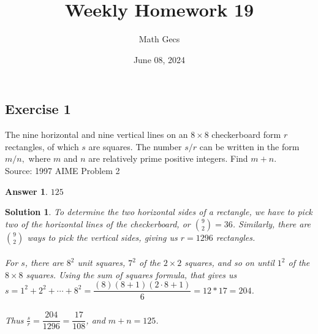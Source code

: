 \documentclass[12pt]{article}
\title{Weekly Homework 19}
\author{Math Gecs}
\date{June 08, 2024}
\newtheorem*{answer*}{Answer}
\newtheorem*{solution*}{Solution}
\begin{document}
\maketitle

\subsection*{Exercise 1}
The nine horizontal and nine vertical lines on an $8\times8$ checkerboard form $r$ rectangles, of which $s$ are squares. The number $s/r$ can be written in the form $m/n,$ where $m$ and $n$ are relatively prime positive integers. Find $m + n.$\\

Source: 1997 AIME Problem 2\\

\begin{answer*}
$\boxed{125}$
\end{answer*}

\begin{solution*}
To determine the two horizontal sides of a rectangle, we have to pick two of the horizontal lines of the checkerboard, or ${9\choose 2} = 36$. Similarly, there are ${9\choose 2}$ ways to pick the vertical sides, giving us $r = 1296$ rectangles.
\\ \\
For $s$, there are $8^2$ unit squares, $7^2$ of the $2\times2$ squares, and so on until $1^2$ of the $8\times 8$ squares. Using the sum of squares formula, that gives us $s=1^2+2^2+\cdots+8^2=\dfrac{(8)(8+1)(2\cdot8+1)}{6}=12*17=204$.
\\ \\
Thus $\frac sr = \dfrac{204}{1296}=\dfrac{17}{108}$, and $m+n=\boxed{125}$.
\end{solution*}
\end{document}
